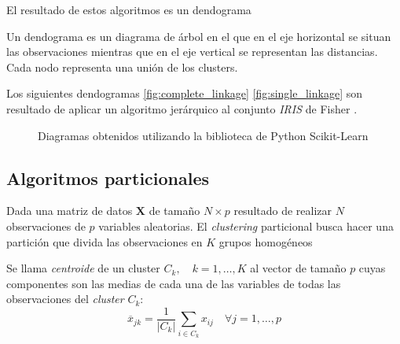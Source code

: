 \noindent El resultado de estos algoritmos es un dendograma \cite{Mardia 1979}
\begin{defi}
Un dendograma es un diagrama de árbol en el que en el eje horizontal se situan las observaciones mientras que en el eje vertical se representan las distancias. Cada nodo representa una unión de los clusters. 
\end{defi}

\noindent Los siguientes dendogramas \ref{fig:complete_linkage} \ref{fig:single_linkage}  son resultado de aplicar un algoritmo jerárquico al conjunto \emph{IRIS} de Fisher \cite{Iris Fisher}.
\begin{figure}[h]
 \centering
 \caption{Diagramas obtenidos utilizando la biblioteca de Python Scikit-Learn}
 \label{fig:Dendogramas distintos enlaces }
\end{figure}
\subsection{Algoritmos particionales}

\noindent Dada una matriz de datos $\mathbf{X}$ de tamaño $N\times p$ resultado de realizar $N$ observaciones de $p$ variables aleatorias. El \emph{clustering} particional busca hacer una partición que divida las observaciones en $K$ grupos homogéneos 

\begin{defi}
Se llama \emph{centroide} de un cluster $C_k,\quad k=1,\ldots,K$ al vector de tamaño $p$ cuyas componentes son las medias de cada una de las variables de todas las observaciones del \emph{cluster} $C_k$:
\begin{equation}
\overline{x}_{jk}=\dfrac{1}{|C_k|}\sum_{i\in C_k}  x_{ij} \quad \forall j=1,\ldots, p
\end{equation}
\end{defi}

